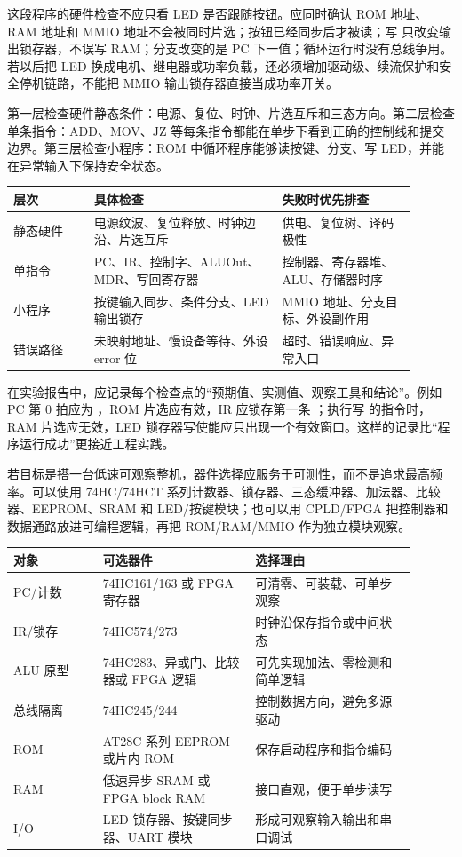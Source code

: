 这段程序的硬件检查不应只看 LED 是否跟随按钮。应同时确认 ROM 地址、RAM 地址和 MMIO 地址不会被同时片选；按钮已经同步后才被读；写  只改变输出锁存器，不误写 RAM；分支改变的是 PC 下一值；循环运行时没有总线争用。若以后把 LED 换成电机、继电器或功率负载，还必须增加驱动级、续流保护和安全停机链路，不能把 MMIO 输出锁存器直接当成功率开关。

第一层检查硬件静态条件：电源、复位、时钟、片选互斥和三态方向。第二层检查单条指令：ADD、MOV、JZ 等每条指令都能在单步下看到正确的控制线和提交边界。第三层检查小程序：ROM 中循环程序能够读按键、分支、写 LED，并能在异常输入下保持安全状态。

\begin{longtable}{L{0.18\linewidth}L{0.42\linewidth}L{0.3\linewidth}}
\toprule
层次 & 具体检查 & 失败时优先排查 \\
\midrule
静态硬件 & 电源纹波、复位释放、时钟边沿、片选互斥 & 供电、复位树、译码极性 \\\tablerowrule
单指令 & PC、IR、控制字、ALUOut、MDR、写回寄存器 & 控制器、寄存器堆、ALU、存储器时序 \\\tablerowrule
小程序 & 按键输入同步、条件分支、LED 输出锁存 & MMIO 地址、分支目标、外设副作用 \\\tablerowrule
错误路径 & 未映射地址、慢设备等待、外设 error 位 & 超时、错误响应、异常入口 \\
\bottomrule
\end{longtable}

在实验报告中，应记录每个检查点的“预期值、实测值、观察工具和结论”。例如 PC 第 0 拍应为 ，ROM 片选应有效，IR 应锁存第一条 ；执行写  的指令时，RAM 片选应无效，LED 锁存器写使能应只出现一个有效窗口。这样的记录比“程序运行成功”更接近工程实践。

若目标是搭一台低速可观察整机，器件选择应服务于可测性，而不是追求最高频率。可以使用 74HC/74HCT 系列计数器、锁存器、三态缓冲器、加法器、比较器、EEPROM、SRAM 和 LED/按键模块；也可以用 CPLD/FPGA 把控制器和数据通路放进可编程逻辑，再把 ROM/RAM/MMIO 作为独立模块观察。

\begin{longtable}{L{0.2\linewidth}L{0.34\linewidth}L{0.36\linewidth}}
\toprule
对象 & 可选器件 & 选择理由 \\
\midrule
PC/计数 & 74HC161/163 或 FPGA 寄存器 & 可清零、可装载、可单步观察 \\\tablerowrule
IR/锁存 & 74HC574/273 & 时钟沿保存指令或中间状态 \\\tablerowrule
ALU 原型 & 74HC283、异或门、比较器或 FPGA 逻辑 & 可先实现加法、零检测和简单逻辑 \\\tablerowrule
总线隔离 & 74HC245/244 & 控制数据方向，避免多源驱动 \\\tablerowrule
ROM & AT28C 系列 EEPROM 或片内 ROM & 保存启动程序和指令编码 \\\tablerowrule
RAM & 低速异步 SRAM 或 FPGA block RAM & 接口直观，便于单步读写 \\\tablerowrule
I/O & LED 锁存器、按键同步器、UART 模块 & 形成可观察输入输出和串口调试 \\
\bottomrule
\end{longtable}

